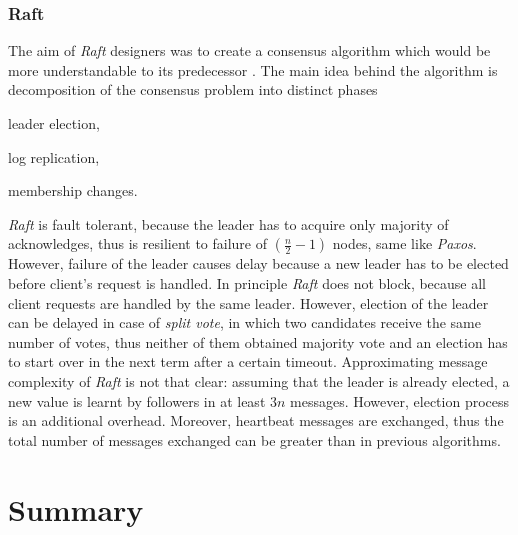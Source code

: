 \documentclass[runningheads,a4paper]{llncs}
\newcommand{\paxos}{\emph{Paxos}\xspace}
\begin{document}
\subsubsection{Raft}

The aim of \emph{Raft} designers was to create a consensus algorithm which would be more understandable to its predecessor \cite{ongaro2014search}. The main idea behind the algorithm is decomposition of the consensus problem into distinct phases \begin{enumerate*}[label=\alph*)]
  \item leader election,
  \item log replication,
  \item membership changes.
\end{enumerate*} 
\emph{Raft} is fault tolerant, because the leader has to acquire only majority of acknowledges, thus is resilient to failure of $(\frac{n}{2}-1)$ nodes, same like \paxos. However, failure of the leader causes delay because a new leader has to be elected before client's request is handled. In principle \emph{Raft} does not block, because all client requests are handled by the same leader. However, election of the leader can be delayed in case of \emph{split vote}, in which two candidates receive the same number of votes, thus neither of them obtained majority vote and an election has to start over in the next term after a certain timeout. Approximating message complexity of \emph{Raft} is not that clear: assuming that the leader is already elected, a new value is learnt by followers in at least $3n$ messages. However, election process is an additional overhead. Moreover, heartbeat messages are exchanged, thus the total number of messages exchanged can be greater than in previous algorithms.

\section{Summary}



 
\end{document}
